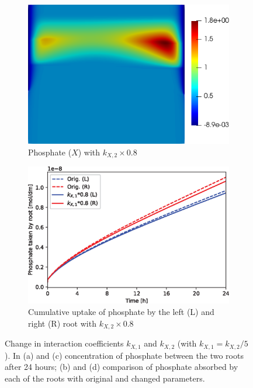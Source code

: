 \documentclass[11pt]{article}
\numberwithin{equation}{section}
\begin{document}
\begin{figure}[!htb]
\begin{subfigure}[t]{0.35\textwidth}
    \includegraphics[trim= 100 100 60 100,width=\textwidth]{Figures/X_kxdown20.png}
    \caption{Phosphate ($X$) with $k_{X,2}\times 0.8$}
    \label{fig:numexp_kdown1}
\end{subfigure}
\hspace{1cm}
\begin{subfigure}[t]{0.4\textwidth}
    \includegraphics[width=\textwidth]{Figures/kxdown20.eps}
    \caption{Cumulative uptake of phosphate by the left (L) and right (R) root with $k_{X,2}\times 0.8$}
    \label{fig:numexp_kdown2}
\end{subfigure}

\caption{Change in interaction coefficients $k_{X,1}$ and $k_{X,2}$ (with $k_{X,1} = k_{X,2}/5$). In (a) and (c) concentration of phosphate between the two roots after 24 hours; (b) and (d) comparison of phosphate absorbed by each of the roots with original and changed parameters.}
\label{fig:numexp_F11w}
\end{figure}
\end{document}
